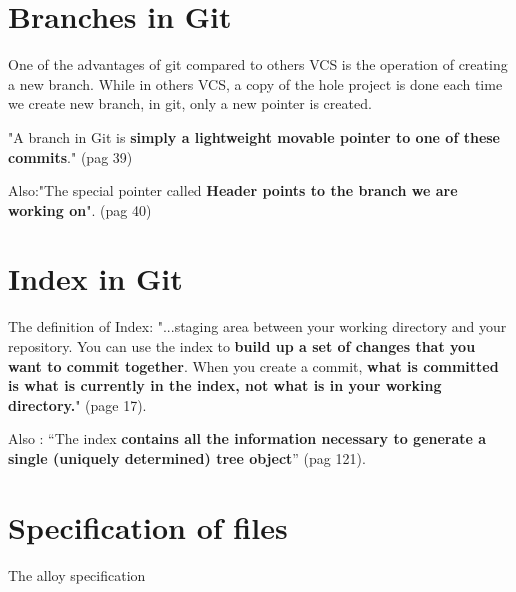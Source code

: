 \section{Branches in Git}
One of the advantages of git compared to others VCS is the operation
of creating a new branch. While in others VCS, a copy of the hole project is
done each time we create new branch, in git, only a new pointer is created.

"A branch in Git is {\bf simply a 
lightweight movable pointer to one of these commits}." \cite{progit} (pag 39) \par

Also:"The special pointer called {\bf Header 
points to the branch we are working on}". \cite{progit} (pag 40) \par


\section{Index in Git}
The definition of Index:
"...staging area between your working directory and your
repository. You can use the index to {\bf build up a set of 
changes that you want to commit together}. When you create
a commit, {\bf what is committed is what is currently in the
index, not what is in your working directory.}"
\cite{gitComm} (page 17). \par

Also : ``The index {\bf contains all the information necessary to generate a single
(uniquely determined) tree object}'' \cite{gitComm} (pag 121). \par

\section{Specification of files}

The alloy specification
